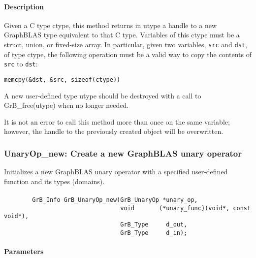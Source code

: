 \paragraph{Description}

Given a C type {\sf ctype}, this method returns in {\sf utype} a handle to
a new GraphBLAS type equivalent to that C type.  Variables of this {\sf ctype} 
must be a struct, union, or fixed-size array. In particular, given two variables, 
{\tt src} and {\tt dst}, of type {\sf ctype}, the following operation must be a 
valid way to copy the contents of {\tt src} to {\tt dst}:

\begin{center}
{\tt memcpy(\&dst, \&src, sizeof({\sf ctype}))}
\end{center}

A new user-defined type {\sf utype} should be destroyed with a call to 
{\sf GrB\_free(utype)} when no longer needed.

It is not an error to call this method more than once on the same variable;  
however, the handle to the previously created object will be overwritten. 

\subsubsection{{\sf UnaryOp\_new}: Create a new GraphBLAS unary operator}

Initializes a new GraphBLAS unary operator with a specified user-defined 
function and its types (domains).

\paragraph{\syntax}

\begin{verbatim}
        GrB_Info GrB_UnaryOp_new(GrB_UnaryOp *unary_op,
                                 void       (*unary_func)(void*, const void*),
                                 GrB_Type     d_out,
                                 GrB_Type     d_in);
\end{verbatim}

\paragraph{Parameters}


